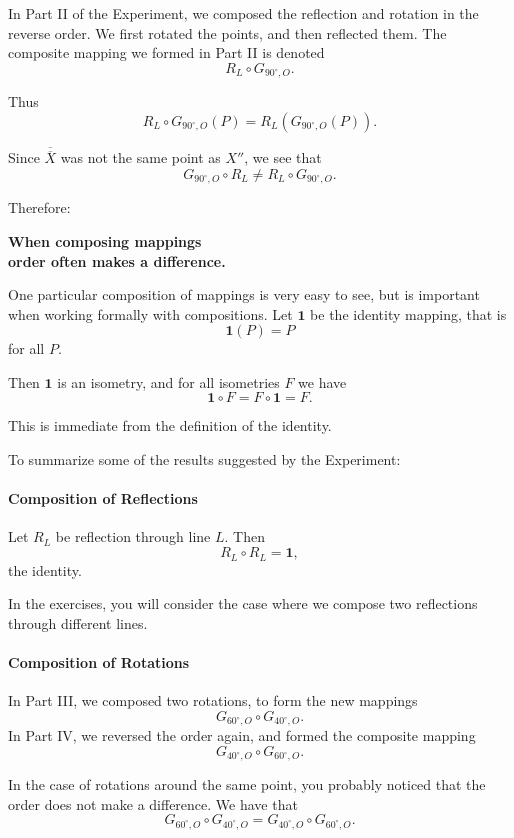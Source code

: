\documentclass[12pt]{book} %
\begin{document}
\begin{ExerciseList}
In Part II of the Experiment, we composed the reflection and rotation in the reverse order. We first rotated the points, and then reflected them. The composite mapping we formed in Part II is denoted
\[
R_L\circ G_{90^\circ,O}.
\]

Thus
\[
R_L\circ G_{90^\circ,O}(P)=R_L(G_{90^\circ,O}(P)).
\]

Since $\overline{\overline{X}}$ was not the same point as $X''$, we see that
\[
G_{90^\circ,O}\circ R_L\ne R_L\circ G_{90^\circ,O}.
\]

Therefore:

\begin{center}
\textbf{When composing mappings}\\
\textbf{order often makes a difference.}
\end{center}

One particular composition of mappings is very easy to see, but is important when working formally with compositions. Let $\mathbf{1}$ be the identity mapping, that is
\[
\mathbf{1}(P)=P
\]
for all $P$.

Then $\mathbf{1}$ is an isometry, and for all isometries $F$ we have
\[
\mathbf{1}\circ F=F\circ \mathbf{1}=F.
\]

This is immediate from the definition of the identity.

To summarize some of the results suggested by the Experiment:

\paragraph{Composition of Reflections}
Let $R_L$ be reflection through line $L$. Then
\[
R_L\circ R_L=\mathbf{1},
\]
the identity.

In the exercises, you will consider the case where we compose two reflections through different lines.

\paragraph{Composition of Rotations}
In Part III, we composed two rotations, to form the new mappings
\[
G_{60^\circ,O}\circ G_{40^\circ,O}.
\]
In Part IV, we reversed the order again, and formed the composite mapping
\[
G_{40^\circ,O}\circ G_{60^\circ,O}.
\]

In the case of rotations around the same point, you probably noticed that the order does not make a difference. We have that
\[
G_{60^\circ,O}\circ G_{40^\circ,O}=G_{40^\circ,O}\circ G_{60^\circ,O}.
\]


\end{ExerciseList}
\end{document}
